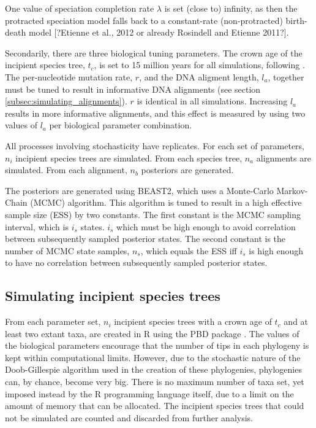 \documentclass{article}
\begin{document}
One value of speciation completion rate $\lambda$ is set (close to) infinity, as
then the protracted speciation model falls back to a constant-rate 
(non-protracted) birth-death model [?Etienne et al., 2012 or already Rosindell and Etienne 2011?].


Secondarily, there are three biological tuning parameters. The crown age of
the incipient species tree, $t_c$, is set to 15 million years for all simulations, 
following \cite{etienne2014estimating}. The per-nucleotide mutation rate, $r$, and the
DNA aligment length, $l_a$, together must be tuned to result in informative
DNA alignments (see section \ref{subsec:simulating_alignments}). $r$ is identical in all
simulations. Increasing $l_a$ results in more informative alignments, and this
effect is measured by using two values of $l_a$ 
per biological parameter combination.


All processes involving stochasticity have replicates. 
For each set of parameters, $n_i$ incipient species trees are simulated. 
From each species tree, $n_a$ alignments are simulated. From each alignment, 
$n_b$ posteriors are generated.


The posteriors are generated using BEAST2, which uses a Monte-Carlo Markov-Chain (MCMC)
algorithm. This algorithm is tuned to result in a high effective sample size (ESS) by
two constants. The first constant is the MCMC sampling interval, which is $i_s$ states.
$i_s$ which must be high enough to avoid correlation between subsequently sampled posterior states.  
The second constant is the number of MCMC state samples, $n_s$, which equals the ESS iff 
$i_s$ is high enough to have no correlation between subsequently sampled posterior states.

\subsection{Simulating incipient species trees}
\label{subsec:simulating_incipient_species_trees}

From each parameter set, $n_i$ incipient species trees with a crown age
of $t_c$ and at least two extant taxa, 
are created in R \cite{R} using the PBD package \cite{PBD}.
The values of the biological parameters encourage that the number of tips in
each phylogeny is kept within computational limits. However, due to
the stochastic nature of the Doob-Gillespie algorithm used in the creation
of these phylogenies, phylogenies can, by chance, become very big. 
There is no maximum number of taxa set, yet imposed instead by the R 
programming language itself, due to a limit on the amount of memory that can be 
allocated. The incipient species trees that could not be simulated are
counted and discarded from further analysis.  
\end{document}
